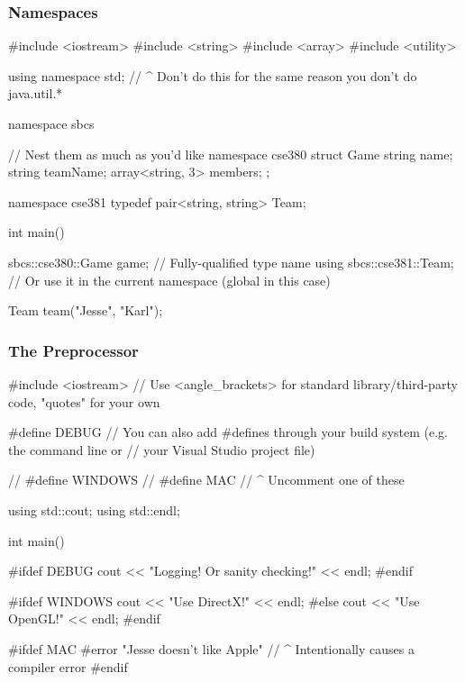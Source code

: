 \documentclass[glossy]{beamer}
\begin{document}
\begin{frame}[fragile=singleslide]
  \frametitle{Namespaces}
  \begin{cppcode}
#include <iostream>
#include <string>
#include <array>
#include <utility>

using namespace std;
// ^ Don't do this for the same reason you don't do java.util.*

namespace sbcs { // Nest them as much as you'd like
  namespace cse380 {
    struct Game {
      string name;
      string teamName;
      array<string, 3> members;
    };
  }

  namespace cse381 {
    typedef pair<string, string> Team;
  }
}

int main() {
  sbcs::cse380::Game game; // Fully-qualified type name
  using sbcs::cse381::Team; // Or use it in the current namespace (global in this case)

  Team team("Jesse", "Karl");
}
  \end{cppcode}
\end{frame}

\begin{frame}[fragile=singleslide]
  \frametitle{The Preprocessor}
  \begin{cppcode}
#include <iostream>
// Use <angle_brackets> for standard library/third-party code, "quotes" for your own 

#define DEBUG 
// You can also add #defines through your build system (e.g. the command line or 
// your Visual Studio project file) 

// #define WINDOWS 
// #define MAC 
// ^ Uncomment one of these 

using std::cout; 
using std::endl; 

int main() { 
  #ifdef DEBUG 
  cout << "Logging! Or sanity checking!" << endl;
  #endif 

  #ifdef WINDOWS
  cout << "Use DirectX!" << endl; 
  #else 
  cout << "Use OpenGL!" << endl; 
  #endif 

  #ifdef MAC 
    #error "Jesse doesn't like Apple"
    // ^ Intentionally causes a compiler error
  #endif
}
  \end{cppcode}
\end{frame}
\end{document}
